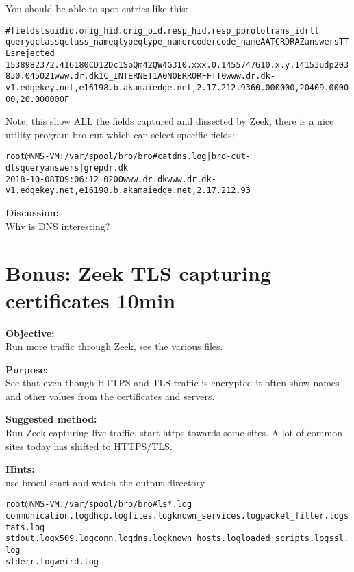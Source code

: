 \documentclass[a4paper,11pt,notitlepage]{report}
\begin{document}
You should be able to spot entries like this:
\begin{alltt}\small
#fields ts      uid     id.orig_h       id.orig_p       id.resp_h       id.resp_p       proto   trans_id        rtt
     query   qclass  qclass_name     qtype   qtype_name      rcode   rcode_name      AA      TC      RD      RA      Z       answers TTLs    rejected
1538982372.416180	CD12Dc1SpQm42QW4G3	10.xxx.0.145	57476	10.x.y.141	53	udp	20383	0.045021	www.dr.dk	1	C_INTERNET	1	A	0	NOERROR	F	F	T	T	0	www.dr.dk-v1.edgekey.net,e16198.b.akamaiedge.net,2.17.212.93	60.000000,20409.000000,20.000000	F
\end{alltt}

Note: this show ALL the fields captured and dissected by Zeek, there is a nice utility program bro-cut which can select specific fields:

\begin{alltt}\small
root@NMS-VM:/var/spool/bro/bro# cat dns.log | bro-cut -d ts query answers | grep dr.dk
2018-10-08T09:06:12+0200	www.dr.dk	www.dr.dk-v1.edgekey.net,e16198.b.akamaiedge.net,2.17.212.93
\end{alltt}

{\bf Discussion:}\\
Why is DNS interesting?


\chapter{Bonus: Zeek TLS capturing certificates 10min}
\label{ex:zeektlsbasic}


{\bf Objective:} \\
Run more traffic through Zeek, see the various files.


{\bf Purpose:}\\
See that even though HTTPS and TLS traffic is encrypted it often show names and other values from the certificates and servers.


{\bf Suggested method:}\\
Run Zeek capturing live traffic, start https towards some sites. A lot of common sites today has shifted to HTTPS/TLS.


{\bf Hints:}\\
use broctl start and watch the output directory

\begin{alltt}\small
root@NMS-VM:/var/spool/bro/bro# ls *.log
communication.log  dhcp.log files.log known_services.log packet_filter.log  stats.log
stdout.log x509.log conn.log dns.log known_hosts.log loaded_scripts.log  ssl.log
stderr.log weird.log
\end{alltt}
\end{document}
